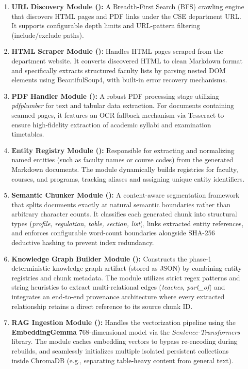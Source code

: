 \documentclass[12pt,a4paper]{report}
\begin{document}
\begin{enumerate}
  \item \textbf{URL Discovery Module ():} A Breadth-First Search (BFS) crawling engine that discovers HTML pages and PDF links under the CSE department URL. It supports configurable depth limits and URL-pattern filtering (include/exclude paths).
  \item \textbf{HTML Scraper Module ():} Handles HTML pages scraped from the department website. It converts discovered HTML to clean Markdown format and specifically extracts structured faculty lists by parsing nested DOM elements using BeautifulSoup4, with built-in error recovery mechanisms.
  \item \textbf{PDF Handler Module ():} A robust PDF processing stage utilizing \textit{pdfplumber} for text and tabular data extraction. For documents containing scanned pages, it features an OCR fallback mechanism via Tesseract to ensure high-fidelity extraction of academic syllabi and examination timetables.
  \item \textbf{Entity Registry Module ():} Responsible for extracting and normalizing named entities (such as faculty names or course codes) from the generated Markdown documents. The module dynamically builds registries for faculty, courses, and programs, tracking aliases and assigning unique entity identifiers.
  \item \textbf{Semantic Chunker Module ():} A content-aware segmentation framework that splits documents exactly at natural semantic boundaries rather than arbitrary character counts. It classifies each generated chunk into structural types (\textit{profile, regulation, table, section, list}), links extracted entity references, and enforces configurable word-count boundaries alongside SHA-256 deductive hashing to prevent index redundancy.
  \item \textbf{Knowledge Graph Builder Module ():} Constructs the phase-1 deterministic knowledge graph artifact (stored as JSON) by combining entity registries and chunk metadata. The module utilizes strict regex patterns and string heuristics to extract multi-relational edges (\textit{teaches}, \textit{part\_of}) and integrates an end-to-end provenance architecture where every extracted relationship retains a direct reference to its source chunk ID.
  \item \textbf{RAG Ingestion Module ():} Handles the vectorization pipeline using the \textbf{EmbeddingGemma} 768-dimensional model via the \textit{Sentence-Transformers} library. The module caches embedding vectors to bypass re-encoding during rebuilds, and seamlessly initializes multiple isolated persistent collections inside ChromaDB (e.g., separating table-heavy content from general text).

\end{enumerate}
\end{document}
